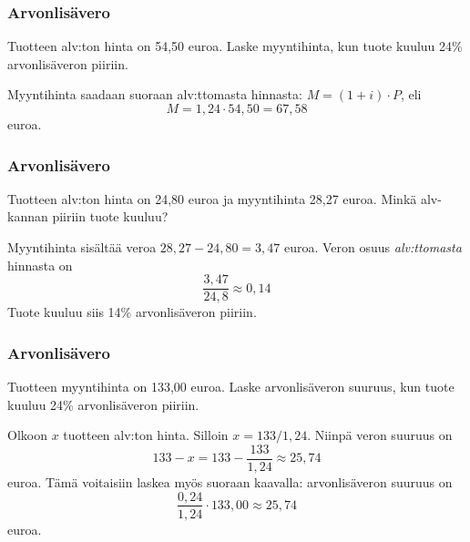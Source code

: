 \documentclass[]{beamer}\usepackage[]{graphicx}\usepackage[]{color}
\begin{document}
\begin{frame}
\frametitle{Arvonlisävero}
	\begin{esim}
		Tuotteen alv:ton hinta on 54,50 euroa. Laske myyntihinta, kun tuote kuuluu 24\% arvonlisäveron piiriin.
	\end{esim}
	\pause
	\begin{ratkaisu}
		Myyntihinta saadaan suoraan alv:ttomasta hinnasta: \(M = (1+i)\cdot P\), eli \pause 
	\[
		M = 1,24\cdot 54,50 = 67,58
	\] euroa.
	\end{ratkaisu}
\end{frame}


\begin{frame}
\frametitle{Arvonlisävero}
	\begin{esim}
		Tuotteen alv:ton hinta on 24,80 euroa ja myyntihinta 28,27 euroa. Minkä alv-kannan piiriin tuote kuuluu?
	\end{esim}
	\pause
	\begin{ratkaisu}
		Myyntihinta sisältää veroa  \(28,27-24,80 = 3,47\) euroa.\pause
		Veron osuus \emph{alv:ttomasta} hinnasta on 
		\[
			\frac{3,47}{24,8} \approx 0,14
		\]
		\pause
		Tuote kuuluu siis 14\% arvonlisäveron piiriin.
	\end{ratkaisu}
\end{frame}

\begin{frame}
\frametitle{Arvonlisävero}
	\begin{esim}
		Tuotteen myyntihinta on 133,00 euroa. Laske arvonlisäveron suuruus, kun tuote kuuluu 24\% arvonlisäveron piiriin.
	\end{esim}
	\pause
	\begin{ratkaisu}
		Olkoon \(x\) tuotteen alv:ton hinta. \pause Silloin \(x= 133/1,24\). \pause Niinpä veron suuruus on \pause
		\[
			133- x = 133 - \frac{133}{1,24}\approx 25,74
		\]
		euroa. \pause Tämä voitaisiin laskea myös suoraan kaavalla: arvonlisäveron suuruus on \pause
			\[
				\frac{0,24}{1,24}\cdot133,00\approx 25,74
			\]
		euroa.
	\end{ratkaisu}
\end{frame}

\end{document}
